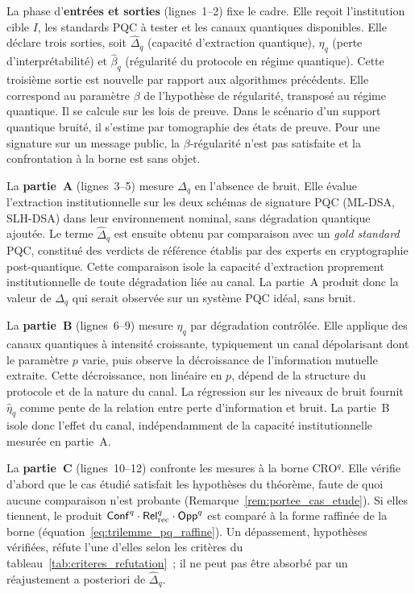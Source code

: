 \begin{sloppypar}
La phase d'\textbf{entr\'ees et sorties} (lignes~1--2) fixe le cadre.
Elle re\c{c}oit l'institution cible $I$, les standards PQC \`a tester et
les canaux quantiques disponibles. Elle d\'eclare trois sorties, soit
$\hat\Delta_q$ (capacit\'e d'extraction quantique), $\hat\eta_q$ (perte
d'interpr\'etabilit\'e) et $\hat\beta_q$ (r\'egularit\'e du protocole en
r\'egime quantique). Cette troisi\`eme sortie est nouvelle par rapport
aux algorithmes pr\'ec\'edents. Elle correspond au param\`etre $\beta$
de l'hypoth\`ese de r\'egularit\'e, transpos\'e au r\'egime quantique. Il se
calcule sur les lois de preuve. Dans le sc\'enario d'un support quantique bruit\'e, il
s'estime par tomographie des \'etats de preuve. Pour une signature sur un message
public, la $\beta$-r\'egularit\'e n'est pas satisfaite et la confrontation \`a la borne
est sans objet.

La \textbf{partie~A} (lignes~3--5) mesure $\Delta_q$ en l'absence de
bruit. Elle \'evalue l'extraction institutionnelle sur les deux
sch\'emas de signature PQC (ML-DSA, SLH-DSA) dans leur
environnement nominal, sans d\'egradation quantique ajout\'ee. Le terme
$\hat\Delta_q$ est ensuite obtenu par comparaison avec un
\emph{gold standard} PQC, constitu\'e des verdicts de r\'ef\'erence \'etablis par
des experts en cryptographie post-quantique. Cette comparaison isole la
capacit\'e d'extraction proprement institutionnelle de toute
d\'egradation li\'ee au canal. La partie~A produit donc la valeur de
$\Delta_q$ qui serait observ\'ee sur un syst\`eme PQC id\'eal, sans
bruit.

La \textbf{partie~B} (lignes~6--9) mesure $\eta_q$ par d\'egradation
contr\^ol\'ee. Elle applique des canaux quantiques \`a intensit\'e
croissante, typiquement un canal d\'epolarisant dont le param\`etre
$p$ varie, puis observe la d\'ecroissance de l'information mutuelle
extraite. Cette d\'ecroissance, non lin\'eaire en $p$,
d\'epend de la structure du protocole et de la nature du canal. La
r\'egression sur les niveaux de bruit fournit $\hat\eta_q$ comme pente
de la relation entre perte d'information et bruit. La partie~B isole
donc l'effet du canal, ind\'ependamment de la capacit\'e
institutionnelle mesur\'ee en partie~A.

La \textbf{partie~C} (lignes~10--12) confronte les mesures \`a la borne
CRO$^q$. Elle v\'erifie d'abord que le cas \'etudi\'e satisfait les hypoth\`eses
du th\'eor\`eme, faute de quoi aucune comparaison n'est probante
(Remarque~\ref{rem:portee_cas_etude}). Si elles tiennent, le produit
$\mathsf{Conf}^q \cdot \mathsf{Rel}_{\mathrm{rec}}^q \cdot \mathsf{Opp}^q$ est compar\'e \`a la forme raffin\'ee de la
borne (\'equation~\eqref{eq:trilemme_pq_raffine}). Un d\'epassement, hypoth\`eses
v\'erifi\'ees, r\'efute l'une d'elles selon les crit\`eres du
tableau~\ref{tab:criteres_refutation}~; il ne peut pas \^etre absorb\'e par un
r\'eajustement a posteriori de $\hat\Delta_q$.


\end{sloppypar}
